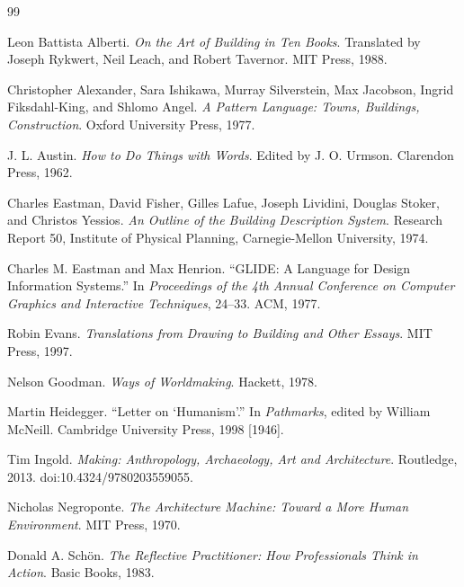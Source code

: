 \documentclass[11pt]{article}
\begin{document}
\begin{thebibliography}{99}

Leon Battista Alberti. \emph{On the Art of Building in Ten Books}. Translated by Joseph Rykwert, Neil Leach, and Robert Tavernor. MIT Press, 1988.

Christopher Alexander, Sara Ishikawa, Murray Silverstein, Max Jacobson, Ingrid Fiksdahl-King, and Shlomo Angel. \emph{A Pattern Language: Towns, Buildings, Construction}. Oxford University Press, 1977.

J. L. Austin. \emph{How to Do Things with Words}. Edited by J. O. Urmson. Clarendon Press, 1962.

Charles Eastman, David Fisher, Gilles Lafue, Joseph Lividini, Douglas Stoker, and Christos Yessios. \emph{An Outline of the Building Description System}. Research Report 50, Institute of Physical Planning, Carnegie-Mellon University, 1974.

Charles M. Eastman and Max Henrion. ``GLIDE: A Language for Design Information Systems.'' In \emph{Proceedings of the 4th Annual Conference on Computer Graphics and Interactive Techniques}, 24--33. ACM, 1977.

Robin Evans. \emph{Translations from Drawing to Building and Other Essays}. MIT Press, 1997.

Nelson Goodman. \emph{Ways of Worldmaking}. Hackett, 1978.

Martin Heidegger. ``Letter on `Humanism'.'' In \emph{Pathmarks}, edited by William McNeill. Cambridge University Press, 1998 [1946].

Tim Ingold. \emph{Making: Anthropology, Archaeology, Art and Architecture}. Routledge, 2013. doi:10.4324/9780203559055.

Nicholas Negroponte. \emph{The Architecture Machine: Toward a More Human Environment}. MIT Press, 1970.

Donald A. Schön. \emph{The Reflective Practitioner: How Professionals Think in Action}. Basic Books, 1983.


\end{thebibliography}
\end{document}
